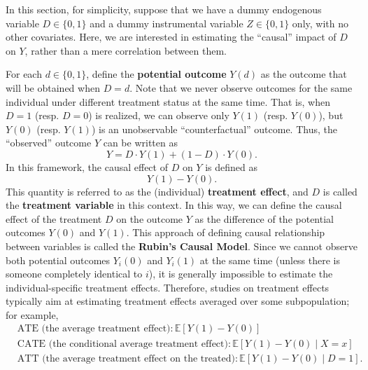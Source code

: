 \documentclass[10.5pt, A4paper, openany, uplatex]{book}
\newcommand{\E}{\mathbb{E}}
\numberwithin{equation}{section}
\begin{document}
In this section, for simplicity, suppose that we have a dummy endogenous variable $D \in \{0,1\}$ and a dummy instrumental variable $Z \in \{0,1\}$ only, with no other covariates.
Here, we are interested in estimating the ``causal'' impact of $D$ on $Y$, rather than a mere correlation between them.

For each $d \in \{0,1\}$, define the \textbf{potential outcome} $Y(d)$ as the outcome that will be obtained when $D = d$.
Note that we never observe outcomes for the same individual under different treatment status at the same time.
That is, when $D = 1$ (resp. $D = 0$) is realized, we can observe only $Y(1)$ (resp. $Y(0)$), but $Y(0)$ (resp. $Y(1)$) is an unobservable ``counterfactual'' outcome.
Thus, the ``observed'' outcome $Y$ can be written as
\[
	Y = D \cdot Y(1) + (1 - D) \cdot Y(0).
\]
In this framework, the causal effect of $D$ on $Y$ is defined as
\[
	Y(1) - Y(0).
\]
This quantity is referred to as the (individual) \textbf{treatment effect}, and $D$ is called the \textbf{treatment variable} in this context.
In this way, we can define the causal effect of the treatment $D$ on the outcome $Y$ as the difference of the potential outcomes $Y(0)$ and $Y(1)$.
This approach of defining causal relationship between variables is called the \textbf{Rubin's Causal Model}.
Since we cannot observe both potential outcomes $Y_i(0)$ and $Y_i(1)$ at the same time (unless there is someone completely identical to $i$), it is generally impossible to estimate the individual-specific treatment effects.
Therefore, studies on treatment effects typically aim at estimating treatment effects averaged over some subpopulation; for example, 
\begin{align*}
	&\text{ATE (the average treatment effect)}: \E[Y(1) - Y(0)]\\
	&\text{CATE (the conditional average treatment effect)}: \E[Y(1) - Y(0) \mid X = x] \\
	&\text{ATT (the average treatment effect on the treated)}: \E[Y(1) - Y(0) \mid D = 1].
\end{align*}
\end{document}
